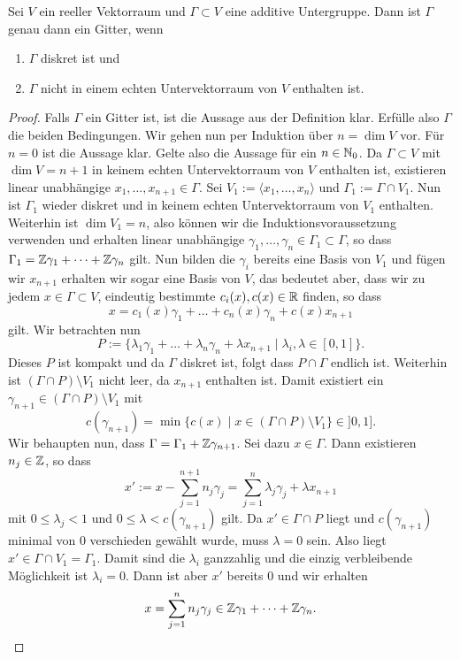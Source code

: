 \begin{lemma}
  \label{lemma:gitter}
  Sei $V$ ein reeller Vektorraum und $\Gamma \subset V$ eine additive
  Untergruppe. Dann ist $\Gamma$ genau dann ein Gitter, wenn
  \begin{enumerate}
  \item $\Gamma$ diskret ist und
  \item $\Gamma$ nicht in einem echten Untervektorraum von $V$
    enthalten ist.
  \end{enumerate}
\end{lemma}

\begin{proof}
  Falls $\Gamma$ ein Gitter ist, ist die Aussage aus der Definition
  klar. Erfülle also $\Gamma$ die beiden Bedingungen. Wir gehen nun
  per Induktion über $n = \dim V$ vor. Für $n = 0$ ist die Aussage klar. Gelte also die
  Aussage für ein $n \in \mathbb{N}_0$. Da $\Gamma \subset V$ mit $\dim V =
  n+1$ in keinem echten
  Untervektorraum von $V$ enthalten ist, existieren linear unabhängige $x_1, \dots,
  x_{n+1} \in \Gamma$. Sei $V_1 := \langle x_1, \dots, x_n \rangle$
  und $\Gamma_1 := \Gamma \cap V_1$. Nun ist $\Gamma_1$ wieder diskret
  und in keinem echten Untervektorraum von $V_1$ enthalten. Weiterhin
  ist $\dim V_1 = n$, also können wir die Induktionsvoraussetzung
  verwenden und erhalten linear unabhängige $\gamma_1, \dots, \gamma_n
  \in \Gamma_1 \subset \Gamma$, so dass $\Gamma_1 = \mathbb{Z} \gamma_1 +
  \dots + \mathbb{Z} \gamma_n$ gilt. Nun bilden die $\gamma_i$ bereits eine
  Basis von $V_1$ und fügen wir $x_{n+1}$ erhalten wir sogar eine Basis
  von $V$, das bedeutet aber, dass wir zu jedem $x \in \Gamma \subset
  V$, eindeutig bestimmte $c_i(x), c(x) \in \mathbb{R}$ finden, so dass
  \[
  x = c_1(x) \gamma_1 + \dots + c_n(x) \gamma_n + c(x) x_{n+1}
  \]
  gilt. Wir betrachten nun
  \[
  P := \{ \lambda_1 \gamma_1 + \dots + \lambda_n \gamma_n + \lambda
  x_{n+1} \mid \lambda_i, \lambda \in [0,1] \}.
  \]
  Dieses $P$ ist kompakt und da $\Gamma$ diskret ist, folgt dass $P
  \cap \Gamma$ endlich ist. Weiterhin ist $( \Gamma \cap P) \setminus
  V_1$ nicht leer, da $x_{n+1}$ enthalten ist. Damit existiert ein
  $\gamma_{n+1} \in ( \Gamma \cap P) \setminus V_1$ mit
  \[
  c(\gamma_{n+1}) = \min \{ c(x) \mid x \in ( \Gamma \cap P ) \setminus
  V_1 \} \in ]0, 1].
  \]
  Wir behaupten nun, dass $\Gamma = \Gamma_1 + \mathbb{Z} \gamma_{n+1}$. Sei
  dazu $x \in \Gamma$. Dann existieren $n_j \in \mathbb{Z}$, so dass
  \[
  x' := x - \sum_{j=1}^{n+1} n_j \gamma_j = \sum_{j=1}^n \lambda_j
  \gamma_j + \lambda x_{n+1}
  \]
  mit $0 \leq \lambda_j < 1$ und $0 \leq \lambda < c(\gamma_{n+1})$
  gilt. Da $x' \in \Gamma \cap P$ liegt und $c(\gamma_{n+1})$ minimal
  von 0 verschieden gewählt wurde, muss $\lambda = 0$ sein. Also liegt
  $x' \in \Gamma \cap V_1 = \Gamma_1$. Damit sind die $\lambda_i$
  ganzzahlig und die einzig verbleibende Möglichkeit ist $\lambda_i =
  0$. Dann ist aber $x'$ bereits 0 und wir erhalten 
  \[
  x = \sum_{j=1}^n n_j \gamma_j \in \mathbb{Z} \gamma_1 + \dots + \mathbb{Z} \gamma_n.
  \]
\end{proof}

